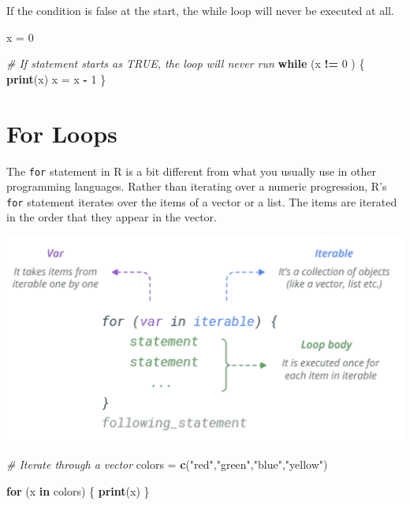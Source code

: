 \documentclass[
]{book}
\newenvironment{Shaded}{\begin{snugshade}}{\end{snugshade}}
\newcommand{\CommentTok}[1]{\textcolor[rgb]{0.56,0.35,0.01}{\textit{#1}}}
\newcommand{\ControlFlowTok}[1]{\textcolor[rgb]{0.13,0.29,0.53}{\textbf{#1}}}
\newcommand{\DecValTok}[1]{\textcolor[rgb]{0.00,0.00,0.81}{#1}}
\newcommand{\KeywordTok}[1]{\textcolor[rgb]{0.13,0.29,0.53}{\textbf{#1}}}
\newcommand{\NormalTok}[1]{#1}
\newcommand{\OperatorTok}[1]{\textcolor[rgb]{0.81,0.36,0.00}{\textbf{#1}}}
\newcommand{\StringTok}[1]{\textcolor[rgb]{0.31,0.60,0.02}{#1}}
\begin{document}
If the condition is false at the start, the while loop will never be executed at all.

\begin{Shaded}
\begin{Highlighting}[]
\NormalTok{x =}\StringTok{ }\DecValTok{0}

\CommentTok{# If statement starts as TRUE,  the loop will never run }
\ControlFlowTok{while}\NormalTok{ (x }\OperatorTok{!=}\StringTok{ }\DecValTok{0}\NormalTok{ ) \{}
  \KeywordTok{print}\NormalTok{(x)}
\NormalTok{  x =}\StringTok{ }\NormalTok{x }\OperatorTok{-}\StringTok{ }\DecValTok{1}
\NormalTok{\}}
\end{Highlighting}
\end{Shaded}

\hypertarget{for-loops}{%
\section{For Loops}\label{for-loops}}

The \texttt{for} statement in R is a bit different from what you usually use in other programming languages. Rather than iterating over a numeric progression, R's \texttt{for} statement iterates over the items of a vector or a list. The items are iterated in the order that they appear in the vector.

\begin{center}\includegraphics[width=16.11in]{images/ForLoop} \end{center}

\begin{Shaded}
\begin{Highlighting}[]
\CommentTok{# Iterate through a vector}
\NormalTok{colors =}\StringTok{ }\KeywordTok{c}\NormalTok{(}\StringTok{"red"}\NormalTok{,}\StringTok{"green"}\NormalTok{,}\StringTok{"blue"}\NormalTok{,}\StringTok{"yellow"}\NormalTok{)}

\ControlFlowTok{for}\NormalTok{ (x }\ControlFlowTok{in}\NormalTok{ colors) \{}
  \KeywordTok{print}\NormalTok{(x)}
\NormalTok{\}}
\end{Highlighting}
\end{Shaded}
\end{document}
